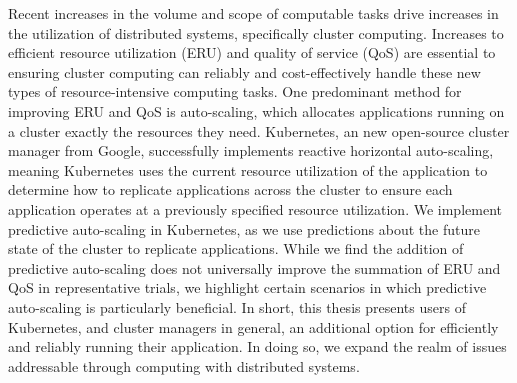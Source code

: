 Recent increases in the volume and scope of computable tasks drive increases in
the utilization of distributed systems, specifically cluster computing.
Increases to efficient resource utilization (ERU) and quality of service (QoS)
are essential to ensuring cluster computing can reliably and cost-effectively handle
these new types of resource-intensive computing tasks. One predominant
method for improving ERU and QoS is auto-scaling,
which allocates applications running on a cluster exactly the
resources they need. Kubernetes, an new open-source cluster manager from
Google, successfully implements reactive horizontal auto-scaling, meaning
Kubernetes uses the current resource utilization of
the application to determine how to
replicate applications across the cluster to ensure each application operates
at a previously specified resource utilization. We implement predictive
auto-scaling in Kubernetes, as we use predictions about the future state
of the cluster to replicate applications. While we find
the addition of predictive auto-scaling does not universally improve the
summation of ERU and QoS in representative trials, we highlight certain
scenarios in which predictive auto-scaling is particularly beneficial. In short,
this thesis presents users of Kubernetes, and cluster managers in general, an
additional option for efficiently and reliably running their application. In
doing so, we expand the realm of issues addressable through computing with
distributed systems.
